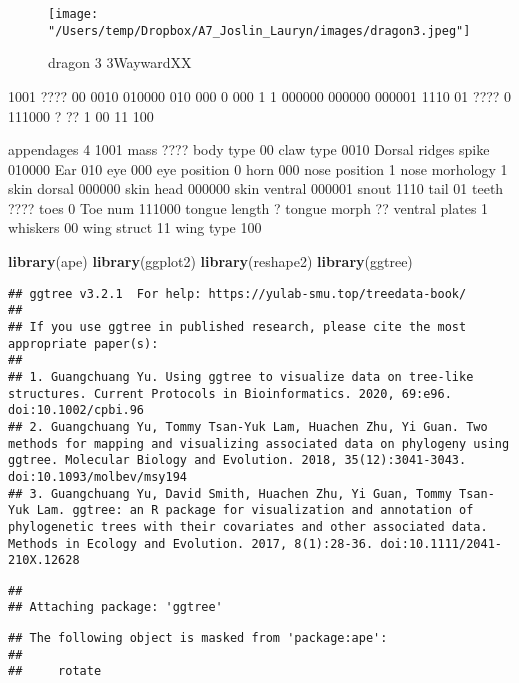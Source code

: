 \documentclass[
]{article}
\newenvironment{Shaded}{\begin{snugshade}}{\end{snugshade}}
\newcommand{\KeywordTok}[1]{\textcolor[rgb]{0.13,0.29,0.53}{\textbf{#1}}}
\newcommand{\NormalTok}[1]{#1}
\begin{document}
\begin{figure}
\centering
\texttt{[image: "/Users/temp/Dropbox/A7\_Joslin\_Lauryn/images/dragon3.jpeg"]}
\caption{dragon 3 3WaywardXX}
\end{figure}

1001 ???? 00 0010 010000 010 000 0 000 1 1 000000 000000 000001 1110 01
???? 0 111000 ? ?? 1 00 11 100

appendages 4 1001 mass ???? body type 00 claw type 0010 Dorsal ridges
spike 010000 Ear 010 eye 000 eye position 0 horn 000 nose position 1
nose morhology 1 skin dorsal 000000 skin head 000000 skin ventral 000001
snout 1110 tail 01 teeth ???? toes 0 Toe num 111000 tongue length ?
tongue morph ?? ventral plates 1 whiskers 00 wing struct 11 wing type
100

\begin{Shaded}
\begin{Highlighting}[]
\KeywordTok{library}\NormalTok{(ape)}
\KeywordTok{library}\NormalTok{(ggplot2)}
\KeywordTok{library}\NormalTok{(reshape2)}
\KeywordTok{library}\NormalTok{(ggtree)}
\end{Highlighting}
\end{Shaded}

\begin{verbatim}
## ggtree v3.2.1  For help: https://yulab-smu.top/treedata-book/
## 
## If you use ggtree in published research, please cite the most appropriate paper(s):
## 
## 1. Guangchuang Yu. Using ggtree to visualize data on tree-like structures. Current Protocols in Bioinformatics. 2020, 69:e96. doi:10.1002/cpbi.96
## 2. Guangchuang Yu, Tommy Tsan-Yuk Lam, Huachen Zhu, Yi Guan. Two methods for mapping and visualizing associated data on phylogeny using ggtree. Molecular Biology and Evolution. 2018, 35(12):3041-3043. doi:10.1093/molbev/msy194
## 3. Guangchuang Yu, David Smith, Huachen Zhu, Yi Guan, Tommy Tsan-Yuk Lam. ggtree: an R package for visualization and annotation of phylogenetic trees with their covariates and other associated data. Methods in Ecology and Evolution. 2017, 8(1):28-36. doi:10.1111/2041-210X.12628
\end{verbatim}

\begin{verbatim}
## 
## Attaching package: 'ggtree'
\end{verbatim}

\begin{verbatim}
## The following object is masked from 'package:ape':
## 
##     rotate
\end{verbatim}
\end{document}

